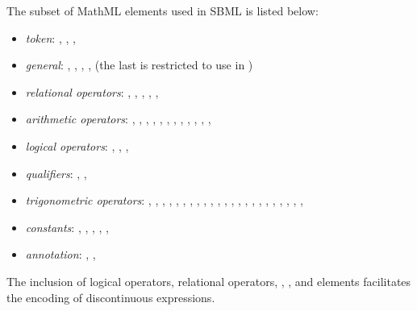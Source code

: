 The subset of MathML elements used in SBML is listed below:
\begin{itemize}\setlength{\parskip}{-0.2ex}

\item \emph{token}: , , ,
  
\item \emph{general}: , ,
  , ,  (the last is
  restricted to use in \FunctionDefinition)

\item \emph{relational operators}: , ,
  , , , 

\item \emph{arithmetic operators}: , ,
  , , , ,
  , , , ,
  , , 

\item \emph{logical operators}: , ,
  , 

\item \emph{qualifiers}: , ,

\item \emph{trigonometric operators}: , ,
  , , , ,
  , , , ,
  , , , ,
  , , , ,
  , , ,
  , , 

\item \emph{constants}: , ,
  , , ,

\item \emph{annotation}: , ,

\end{itemize}
\vspace*{-0.75ex}
The inclusion of logical operators, relational operators,
, , and  elements
facilitates the encoding of discontinuous expressions.

